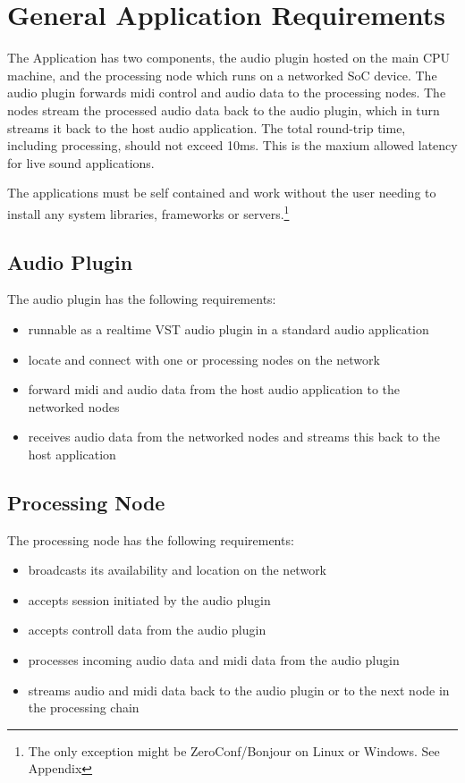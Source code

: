 \section{General Application Requirements}

The Application has two components, the audio plugin hosted on the main CPU machine, and the processing node which runs on a networked SoC device. The audio plugin forwards midi control and audio data to the processing nodes. The nodes stream the processed audio data back to the audio plugin, which in turn streams it back to the host audio application. The total round-trip time, including processing, should not exceed 10ms. This is the maxium allowed latency for live sound applications. \cite{AES67-2013}

The applications must be self contained and work without the user needing to install any system libraries, frameworks or servers.\footnote{The only exception might be ZeroConf/Bonjour on Linux or Windows. See Appendix}

\subsection{Audio Plugin}

The audio plugin has the following requirements:

\begin{itemize}

\item runnable as a realtime VST audio plugin in a standard audio application
\item locate and connect with one or processing nodes on the network
\item forward midi and audio data from the host audio application to the networked nodes
\item receives audio data from the networked nodes and streams this back to the host application

\end{itemize}

\subsection{Processing Node}

The processing node has the following requirements:
\begin{itemize}

\item broadcasts its availability and location on the network
\item accepts session initiated by the audio plugin
\item accepts controll data from the audio plugin
\item processes incoming audio data and midi data from the audio plugin
\item streams audio and midi data back to the audio plugin or to the next node in the processing chain

\end{itemize}

